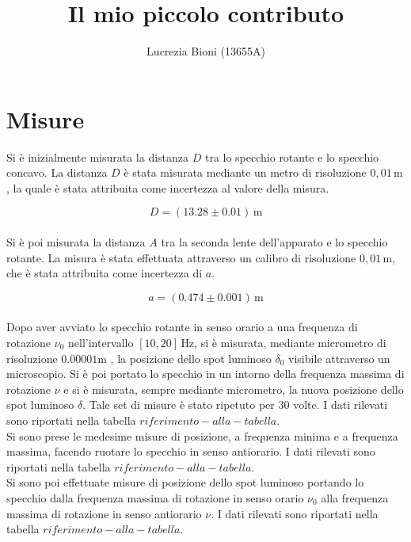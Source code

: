 \documentclass{article} %
\title{Il mio piccolo contributo} %
\author{Lucrezia Bioni (13655A)} %
\date{} %
\let\oldsection\section%
\renewcommand{\section}{%
	\renewcommand{\theequation}{\thesection.\arabic{equation}}%
	\oldsection}%
\begin{document}
    \maketitle
    \section{Misure} %
    
    Si è inizialmente misurata la distanza $D$ tra lo specchio rotante e lo specchio concavo. La distanza $D$ è stata misurata 
    mediante un metro di risoluzione $ 0,01 \, \text{m} $, la quale è stata attribuita come incertezza al valore della misura.

    \begin{equation}
        \label{3.1}
        D = (13.28 \pm 0.01) \, \text{m}
    \end{equation} \\
    Si è poi misurata la distanza $A$ tra la seconda lente dell'apparato e lo specchio rotante. La misura è stata effettuata
    attraverso un calibro di risoluzione $ 0,01 \, \text{m} $, che è stata attribuita come incertezza di $a$.
    
    \begin{equation}
        \label{3.1}
        a = (0.474 \pm 0.001) \, \text{m}
    \end{equation} \\
    Dopo aver avviato lo specchio rotante in senso orario a una frequenza di rotazione $ \nu_0 $ nell'intervallo $[10,20] \, \text{Hz}$,
    si è misurata, mediante micrometro di risoluzione $ 0.00001 \text{m} $ , la posizione dello spot luminoso $\delta_0$ visibile attraverso
    un microscopio. Si è poi portato lo specchio in un intorno della frequenza massima di rotazione $ \nu $ e si è misurata,
    sempre mediante micrometro, la nuova posizione dello spot luminoso $\delta$. Tale set di misure è stato ripetuto per $30$ volte.
    I dati rilevati sono riportati nella tabella $ riferimento-alla-tabella $. \\ 

    Si sono prese le medesime misure di posizione, a frequenza minima e a frequenza massima, facendo ruotare
    lo specchio in senso antiorario. I dati rilevati sono riportati nella tabella $ riferimento-alla-tabella $. \\ 

    Si sono poi effettuate misure di posizione dello spot luminoso portando lo specchio dalla frequenza massima di rotazione in senso
    orario $\nu_0$ alla frequenza massima di rotazione in senso antiorario $\nu$.
    I dati rilevati sono riportati nella tabella $ riferimento-alla-tabella $. \\
\end{document}
